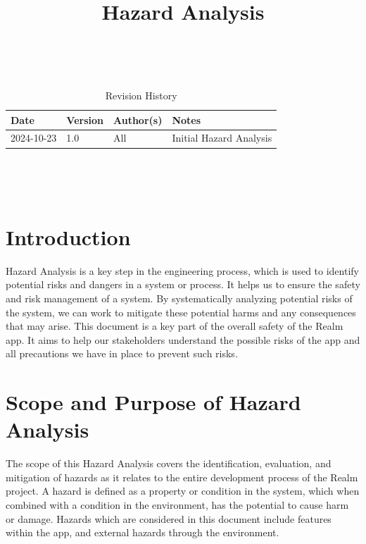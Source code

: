 \documentclass{article}
\title{Hazard Analysis\\\progname}
\author{\authname}
\date{}
\begin{document}
\maketitle
\thispagestyle{empty}

~\newpage


\begin{table}[hp]
    \caption{Revision History} \label{rev_history_table}
    \begin{tabularx}{\textwidth}{p{3cm}p{2cm}p{3cm}X}
        \toprule {\textbf{Date}} & {\textbf{Version}} & {\textbf{Author(s)}} & {\textbf{Notes}} \\
        \midrule
        2024-10-23               & 1.0         & All      & Initial Hazard Analysis      \\
        \bottomrule
    \end{tabularx}
\end{table}

~\newpage

\tableofcontents

~\newpage


\section{Introduction}

Hazard Analysis is a key step in the engineering process, which is used to identify potential risks and dangers in a system or process. It helps us to ensure the safety and risk management of a system. By systematically analyzing potential risks of the system, we can work to mitigate these potential harms and any consequences that may arise. This document is a key part of the overall safety of the Realm app. It aims to help our stakeholders understand the possible risks of the app and all precautions we have in place to prevent such risks.

\section{Scope and Purpose of Hazard Analysis}

The scope of this Hazard Analysis covers the identification, evaluation, and mitigation of hazards as it relates to the entire development process of the Realm project. A hazard is defined as a property or condition in the system, which when combined with a condition in the environment, has the potential to cause harm or damage. Hazards which are considered in this document include features within the app, and external hazards through the environment.\\
\end{document}
